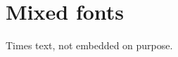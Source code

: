 \documentclass{article}
\begin{document}
\section{Mixed fonts}
{\selectfont Times text, not embedded on purpose.}
\end{document}
